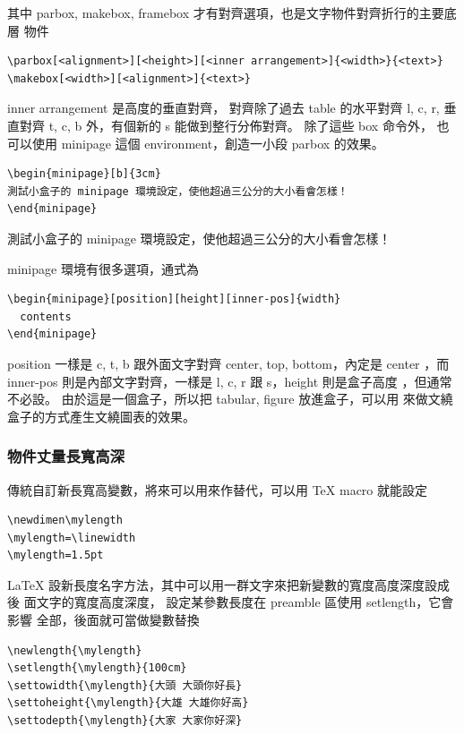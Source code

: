     其中 parbox, makebox, framebox 才有對齊選項，也是文字物件對齊折行的主要底層
    物件
    \begin{verbatim}
\parbox[<alignment>][<height>][<inner arrangement>]{<width>}{<text>}
\makebox[<width>][<alignment>]{<text>}
    \end{verbatim}
    inner arrangement 是高度的垂直對齊， 對齊除了過去 table 的水平對齊 l, c, r, 
    垂直對齊 t, c, b 外，有個新的 s 能做到整行分佈對齊。 除了這些 box 命令外，
    也可以使用 minipage 這個 environment，創造一小段 parbox 的效果。
    \begin{verbatim}
\begin{minipage}[b]{3cm}
測試小盒子的 minipage 環境設定，使他超過三公分的大小看會怎樣！
\end{minipage}
    \end{verbatim}
    \begin{minipage}[b]{3cm}
測試小盒子的 minipage 環境設定，使他超過三公分的大小看會怎樣！
    \end{minipage}
    minipage 環境有很多選項，通式為
    \begin{verbatim}
\begin{minipage}[position][height][inner-pos]{width}
  contents
\end{minipage}
    \end{verbatim}
    position 一樣是 c, t, b 跟外面文字對齊 center, top, bottom，內定是 center
    ，而 inner-pos 則是內部文字對齊，一樣是 l, c, r 跟 s，height 則是盒子高度
    ，但通常不必設。 由於這是一個盒子，所以把 tabular, figure 放進盒子，可以用
    來做文繞盒子的方式產生文繞圖表的效果。

    \subsubsection{物件丈量長寬高深}
    傳統自訂新長寬高變數，將來可以用來作替代，可以用 \TeX{} macro 就能設定
    \begin{verbatim}
\newdimen\mylength
\mylength=\linewidth
\mylength=1.5pt
    \end{verbatim}
    {\LaTeX} 設新長度名字方法，其中可以用一群文字來把新變數的寬度高度深度設成後
    面文字的寬度高度深度， 設定某參數長度在 preamble 區使用 setlength，它會影響
    全部，後面就可當做變數替換
    \begin{verbatim}
\newlength{\mylength}
\setlength{\mylength}{100cm}
\settowidth{\mylength}{大頭 大頭你好長}
\settoheight{\mylength}{大雄 大雄你好高}
\settodepth{\mylength}{大家 大家你好深}
    \end{verbatim}

